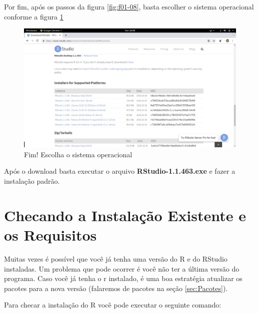 \documentclass[12pt,a4paper,oneside]{erdc}
\begin{document}
Por fim, após os passos da figura \ref{fig:f01-08}, basta escolher o sistema operacional conforme a figura \ref{fig:f01-09}

\begin{figure}[htpb!]
	\centering
	\includegraphics[width=\linewidth]{../figs/BP_Curso_TecComp_00_2019_f01-09}
	\caption{Fim! Escolha o sistema operacional}
	\label{fig:f01-09}
\end{figure}

Após o download basta executar o arquivo \textbf{RStudio-1.1.463.exe} e fazer a instalação padrão.

\section{Checando a Instalação Existente e os Requisitos}

Muitas vezes é possível que você já tenha uma versão do R e do RStudio instaladas. Um problema que pode ocorrer é você não ter a última versão do programa. Caso você já tenha o r instalado, é uma boa estratégia atualizar os pacotes para a nova versão (falaremos de pacotes na seção \ref{sec:Pacotes}).

Para checar a instalação do R você pode executar o seguinte comando:
\end{document}

